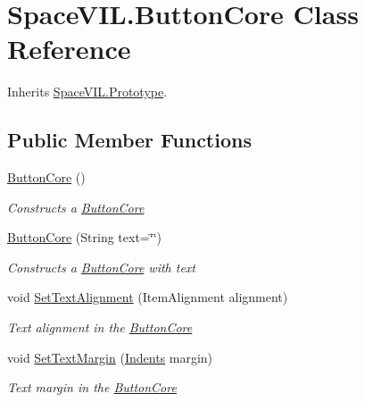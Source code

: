 \hypertarget{class_space_v_i_l_1_1_button_core}{}\section{Space\+V\+I\+L.\+Button\+Core Class Reference}
\label{class_space_v_i_l_1_1_button_core}


Inherits \mbox{\hyperlink{class_space_v_i_l_1_1_prototype}{Space\+V\+I\+L.\+Prototype}}.

\subsection*{Public Member Functions}
\begin{DoxyCompactItemize}
\item 
\mbox{\hyperlink{class_space_v_i_l_1_1_button_core_ab1139f0c4796d74ef4444f79626d751c}{Button\+Core}} ()
\begin{DoxyCompactList}\small\item\em Constructs a \mbox{\hyperlink{class_space_v_i_l_1_1_button_core}{Button\+Core}} \end{DoxyCompactList}\item 
\mbox{\hyperlink{class_space_v_i_l_1_1_button_core_af14e7efaa232a4ce2685fad35b6d691a}{Button\+Core}} (String text=\char`\"{}\char`\"{})
\begin{DoxyCompactList}\small\item\em Constructs a \mbox{\hyperlink{class_space_v_i_l_1_1_button_core}{Button\+Core}} with text \end{DoxyCompactList}\item 
void \mbox{\hyperlink{class_space_v_i_l_1_1_button_core_ae7f849e629f8bd356608066de26f9996}{Set\+Text\+Alignment}} (Item\+Alignment alignment)
\begin{DoxyCompactList}\small\item\em Text alignment in the \mbox{\hyperlink{class_space_v_i_l_1_1_button_core}{Button\+Core}} \end{DoxyCompactList}\item 
void \mbox{\hyperlink{class_space_v_i_l_1_1_button_core_ad1d215401ec59acf1c54cfa036606b0f}{Set\+Text\+Margin}} (\mbox{\hyperlink{struct_space_v_i_l_1_1_decorations_1_1_indents}{Indents}} margin)
\begin{DoxyCompactList}\small\item\em Text margin in the \mbox{\hyperlink{class_space_v_i_l_1_1_button_core}{Button\+Core}} \end{DoxyCompactList}\item 

\end{DoxyCompactItemize}
